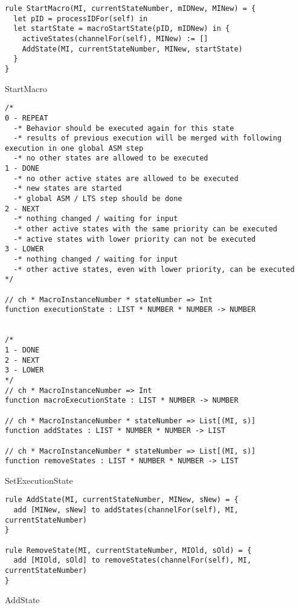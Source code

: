\begin{listing}[H]
\begin{verbatim}
rule StartMacro(MI, currentStateNumber, mIDNew, MINew) = {
  let pID = processIDFor(self) in
  let startState = macroStartState(pID, mIDNew) in {
    activeStates(channelFor(self), MINew) := []
    AddState(MI, currentStateNumber, MINew, startState)
  }
}
\end{verbatim}
\caption{StartMacro}
\label{lst:asm:StartMacro}
\end{listing}




\begin{listing}[H]
\begin{verbatim}
/*
0 - REPEAT
  -* Behavior should be executed again for this state
  -* results of previous execution will be merged with following execution in one global ASM step
  -* no other states are allowed to be executed
1 - DONE
  -* no other active states are allowed to be executed
  -* new states are started
  -* global ASM / LTS step should be done
2 - NEXT
  -* nothing changed / waiting for input
  -* other active states with the same priority can be executed
  -* active states with lower priority can not be executed
3 - LOWER
  -* nothing changed / waiting for input
  -* other active states, even with lower priority, can be executed
*/

// ch * MacroInstanceNumber * stateNumber => Int
function executionState : LIST * NUMBER * NUMBER -> NUMBER


/*
1 - DONE
2 - NEXT
3 - LOWER
*/
// ch * MacroInstanceNumber => Int
function macroExecutionState : LIST * NUMBER -> NUMBER

// ch * MacroInstanceNumber * stateNumber => List[(MI, s)]
function addStates : LIST * NUMBER * NUMBER -> LIST

// ch * MacroInstanceNumber * stateNumber => List[(MI, s)]
function removeStates : LIST * NUMBER * NUMBER -> LIST
\end{verbatim}
\caption{SetExecutionState}
\label{lst:asm:SetExecutionState}
\end{listing}




\begin{listing}[H]
\begin{verbatim}
rule AddState(MI, currentStateNumber, MINew, sNew) = {
  add [MINew, sNew] to addStates(channelFor(self), MI, currentStateNumber)
}

rule RemoveState(MI, currentStateNumber, MIOld, sOld) = {
  add [MIOld, sOld] to removeStates(channelFor(self), MI, currentStateNumber)
}
\end{verbatim}
\caption{AddState}
\label{lst:asm:AddState}
\end{listing}







